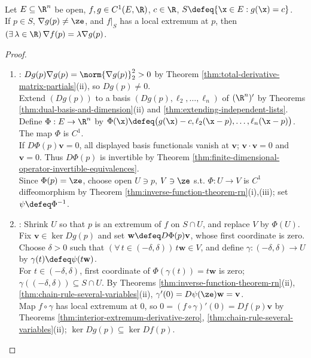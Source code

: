 \begin{samepage}
\begin{theorem} \label{thm:lagrange-multiplier-one-constraint} \\
Let $E\subseteq\R^n$ be open, $f,g\in C^1(E,\R)$, $c\in\R$, $S\defeq\{\x\in E:g(\x)=c\}$.\\
If $p\in S$, $\nabla g(p)\neq\ze$, and $f|_S$ has a local extremum at $p$, then $(\exists\,\lambda\in\R)\,\nabla f(p)=\lambda\nabla g(p)$.
\begin{proof}
\begin{enumerate}[label=(\roman*)]
\setlength{\itemsep}{0pt}
\item {}: $Dg(p)\nabla g(p)=\norm{\nabla g(p)}_2^2>0$ by Theorem \ref{thm:total-derivative-matrix-partials}(ii), so $Dg(p)\neq0$.\\
Extend $(Dg(p))$ to a basis $(Dg(p),\ell_2,\ldots,\ell_n)$ of $(\R^n)'$ by Theorems \ref{thm:dual-basis-and-dimension}(ii) and \ref{thm:extending-independent-lists}.\\
Define $\Phi:E\to\R^n$ by $\Phi(\x)\defeq\bigl(g(\x)-c,\ell_2(\x-p),\ldots,\ell_n(\x-p)\bigr)$. The map $\Phi$ is $C^1$.\\
If $D\Phi(p)\mathbf v=0$, all displayed basis functionals vanish at $\mathbf v$; $\mathbf v\cdot\mathbf v=0$ and $\mathbf v=0$. Thus $D\Phi(p)$ is invertible by Theorem \ref{thm:finite-dimensional-operator-invertible-equivalences}.\\
Since $\Phi(p)=\ze$, choose open $U\ni p$, $V\ni\ze$ s.t. $\Phi:U\to V$ is $C^1$ diffeomorphism by Theorem \ref{thm:inverse-function-theorem-rn}(i),(iii); set $\psi\defeq\Phi^{-1}$.
\item {}: Shrink $U$ so that $p$ is an extremum of $f$ on $S\cap U$, and replace $V$ by $\Phi(U)$.\\
Fix $\mathbf v\in\ker Dg(p)$ and set $\mathbf w\defeq D\Phi(p)\mathbf v$, whose first coordinate is zero.\\
Choose $\delta>0$ such that $(\forall\,t\in(-\delta,\delta))\,t\mathbf w\in V$, and define $\gamma:(-\delta,\delta)\to U$ by $\gamma(t)\defeq\psi(t\mathbf w)$.\\
For $t\in(-\delta,\delta)$, first coordinate of $\Phi(\gamma(t))=t\mathbf w$ is zero; $\gamma((-\delta,\delta))\subseteq S\cap U$. By Theorems \ref{thm:inverse-function-theorem-rn}(ii), \ref{thm:chain-rule-several-variables}(ii), $\gamma'(0)=D\psi(\ze)\mathbf w=\mathbf v$.\\
Map $f\circ\gamma$ has local extremum at $0$, so $0=(f\circ\gamma)'(0)=Df(p)\mathbf v$ by Theorems \ref{thm:interior-extremum-derivative-zero}, \ref{thm:chain-rule-several-variables}(ii); $\ker Dg(p)\subseteq\ker Df(p)$.

\end{enumerate}
\end{proof}
\end{theorem}
\end{samepage}
